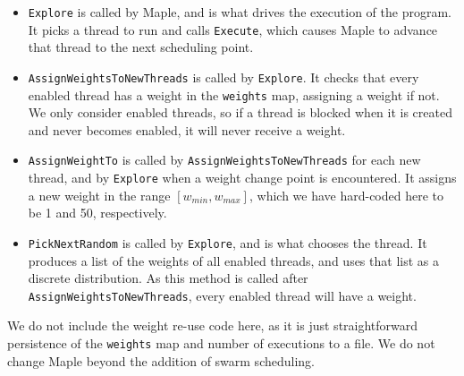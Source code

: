 \begin{itemize}
\item \verb|Explore| is called by Maple, and is what drives the
  execution of the program.  It picks a thread to run and calls
  \verb|Execute|, which causes Maple to advance that thread to the
  next scheduling point.

\item \verb|AssignWeightsToNewThreads| is called by \verb|Explore|.
  It checks that every enabled thread has a weight in the
  \verb|weights| map, assigning a weight if not.  We only consider
  enabled threads, so if a thread is blocked when it is created and
  never becomes enabled, it will never receive a weight.

\item \verb|AssignWeightTo| is called by
  \verb|AssignWeightsToNewThreads| for each new thread, and by
  \verb|Explore| when a weight change point is encountered.  It
  assigns a new weight in the range $[w_{min}, w_{max}]$, which we
  have hard-coded here to be 1 and 50, respectively.

\item \verb|PickNextRandom| is called by \verb|Explore|, and is what
  chooses the thread.  It produces a list of the weights of all
  enabled threads, and uses that list as a discrete distribution.  As
  this method is called after \verb|AssignWeightsToNewThreads|, every
  enabled thread will have a weight.
\end{itemize}

We do not include the weight re-use code here, as it is just
straightforward persistence of the \verb|weights| map and number of
executions to a file.  We do not change Maple beyond the addition of
swarm scheduling.
